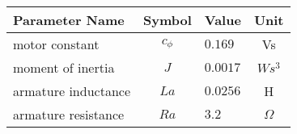 \begin{tabular}{lclc}
\hline
 Parameter Name      &   Symbol   & Value    &   Unit   \\
\hline
 motor constant      & $c_{\phi}$ & $0.169$  &    Vs    \\
 moment of inertia   &    $J$     & $0.0017$ &  $Ws^3$  \\
 armature inductance &    $La$    & $0.0256$ &    H     \\
 armature resistance &    $Ra$    & $3.2$    & $\Omega$ \\
\hline
\end{tabular}
